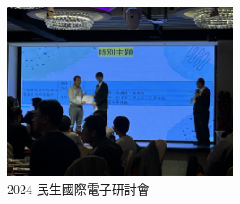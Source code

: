\documentclass[12pt,a4paper]{article}
\begin{document}
\begin{enumerate}
\begin{enumerate}[label=\arabic*.]
\begin{figure}[H]
            \hfill
            \begin{minipage}[t]{0.45\textwidth}
                \centering
                \includegraphics[height=5cm]{resources/image/民生國際電子研討會.jpg}
                \caption{2024 民生國際電子研討會}
                \label{fig:iwce}
            \end{minipage}
        \end{figure}
\end{enumerate}


\end{enumerate}
\end{document}
